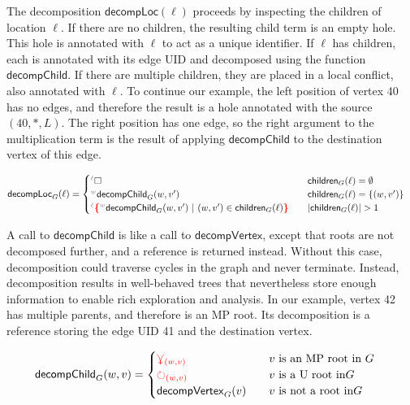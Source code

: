 The decomposition $\mathsf{decompLoc}(\ell)$ proceeds by inspecting the children of location $\ell$. If there are no children, the resulting child term is an empty hole. This hole is annotated with $\ell$ to act as a unique identifier. If $\ell$ has children, each is annotated with its edge UID and decomposed using the function $\mathsf{decompChild}$. If there are multiple children, they are placed in a local conflict, also annotated with $\ell$. To continue our example, the left position of vertex 40 has no edges, and therefore the result is a hole annotated with the source $(40, \texttt{*}, L)$. The right position has one edge, so the right argument to the multiplication term is the result of applying $\mathsf{decompChild}$ to the destination vertex of this edge. 

\begin{definition}
\begin{align*}
    \mathsf{decompLoc}_{G}(\ell) &= \begin{cases}
        \ehole &\quad \mathsf{children}_{G}(\ell) = \emptyset \\ \eid{w}{}{\mathsf{decompChild}_G(w, v')} &\quad \mathsf{children}_{G}(\ell) = \SetOf{(w,v')}\\ \conflictHoleTerm{\ell}{\eid{w}{}{\mathsf{decompChild}_G(w, v')} \SuchThat{(w,v') \in \mathsf{children}_{G}(\ell)}} &\quad \abs{\mathsf{children}_{G}(\ell)} > 1 \\
    \end{cases}
\end{align*}
\end{definition}

A call to $\mathsf{decompChild}$ is like a call to $\mathsf{decompVertex}$, except that roots are not decomposed further, and a reference is returned instead. Without this case, decomposition could traverse cycles in the graph and never terminate. Instead, decomposition results in well-behaved trees that nevertheless store enough information to enable rich exploration and analysis. In our example, vertex 42 has multiple parents, and therefore is an MP root. Its decomposition is a reference storing the edge UID 41 and the destination vertex.

\begin{definition}
\begin{align*}
    \mathsf{decompChild}_G(w, v)  &= \begin{cases}
        \textcolor{red}{\curlyveedownarrow_{(w,v)}}  &\quad v\text{ is an MP root in } G\\
        \textcolor{red}{\circlearrowright_{(w,v)}}  &\quad v\text{ is a U root in} G\\
        \mathsf{decompVertex}_{G}(v) &\quad v\text{ is not a root in} G
    \end{cases} 
\end{align*}
\end{definition}


